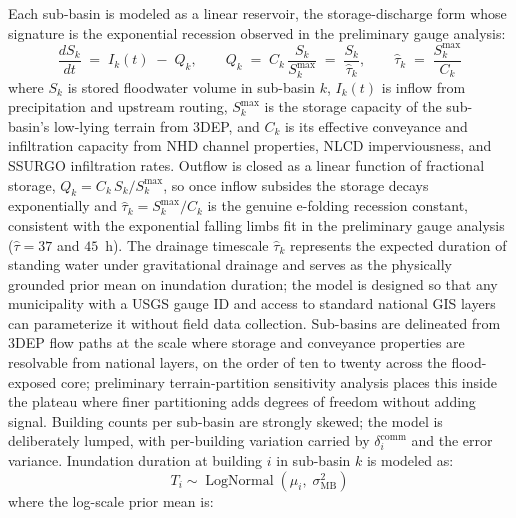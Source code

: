 \documentclass[11pt]{article}
\begin{document}
Each sub-basin is modeled as a linear reservoir, the storage-discharge form whose
signature is the exponential recession observed in the preliminary gauge analysis:
\begin{equation}\label{eq:tau}
  \frac{dS_k}{dt} \;=\; I_k(t) \;-\; Q_k,
  \qquad
  Q_k \;=\; C_k\,\frac{S_k}{S_k^{\mathrm{max}}} \;=\; \frac{S_k}{\hat{\tau}_k},
  \qquad
  \hat{\tau}_k \;=\; \frac{S_k^{\mathrm{max}}}{C_k}
\end{equation}
where $S_k$ is stored floodwater volume in sub-basin $k$, $I_k(t)$ is inflow from
precipitation and upstream routing, $S_k^{\mathrm{max}}$ is the storage capacity
of the sub-basin's low-lying terrain from 3DEP, and $C_k$ is its effective
conveyance and infiltration capacity from NHD channel properties, NLCD
imperviousness, and SSURGO infiltration rates. Outflow is closed as a linear
function of fractional storage, $Q_k = C_k\,S_k/S_k^{\mathrm{max}}$, so once
inflow subsides the storage decays exponentially and $\hat{\tau}_k =
S_k^{\mathrm{max}}/C_k$ is the genuine e-folding recession constant, consistent
with the exponential falling limbs fit in the preliminary gauge analysis
($\hat{\tau} = 37$ and $45$~h).
The drainage timescale $\hat{\tau}_k$ represents the expected duration of standing
water under gravitational drainage and serves as the physically grounded prior mean
on inundation duration; the model is designed so that any municipality with a USGS
gauge ID and access to standard national GIS layers can parameterize it without
field data collection.
Sub-basins are delineated from 3DEP flow paths at the scale where storage and
conveyance properties are resolvable from national layers, on the order of ten to
twenty across the flood-exposed core; preliminary terrain-partition sensitivity analysis
places this inside the plateau where finer partitioning adds degrees of
freedom without adding signal. Building counts per sub-basin are strongly skewed;
the model is deliberately lumped, with per-building variation carried by
$\delta_i^{\mathrm{comm}}$ and the error variance.
Inundation duration at building $i$ in sub-basin $k$ is modeled as:
\begin{equation}\label{eq:prior}
  T_i \sim \operatorname{LogNormal}(\mu_i,\; \sigma_{\mathrm{MB}}^2)
\end{equation}
where the log-scale prior mean is:
\end{document}
